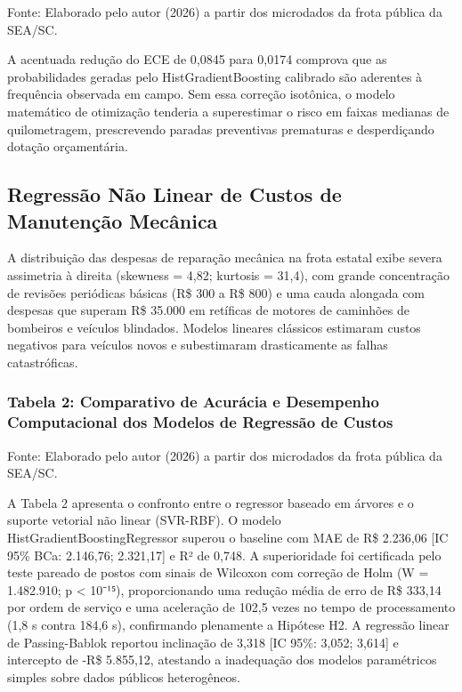 \documentclass[12pt,a4paper]{article}
\begin{document}
Fonte: Elaborado pelo autor (2026) a partir dos microdados da frota pública da SEA/SC.

A acentuada redução do ECE de 0,0845 para 0,0174 comprova que as probabilidades geradas pelo HistGradientBoosting calibrado são aderentes à frequência observada em campo. Sem essa correção isotônica, o modelo matemático de otimização tenderia a superestimar o risco em faixas medianas de quilometragem, prescrevendo paradas preventivas prematuras e desperdiçando dotação orçamentária.


\subsection{Regressão Não Linear de Custos de Manutenção Mecânica}

A distribuição das despesas de reparação mecânica na frota estatal exibe severa assimetria à direita (skewness = 4,82; kurtosis = 31,4), com grande concentração de revisões periódicas básicas (R\$ 300 a R\$ 800) e uma cauda alongada com despesas que superam R\$ 35.000 em retíficas de motores de caminhões de bombeiros e veículos blindados. Modelos lineares clássicos estimaram custos negativos para veículos novos e subestimaram drasticamente as falhas catastróficas.


\subsubsection{Tabela 2: Comparativo de Acurácia e Desempenho Computacional dos Modelos de Regressão de Custos}

\begin{table}[htbp]
\centering
\small
{}
\end{table}

Fonte: Elaborado pelo autor (2026) a partir dos microdados da frota pública da SEA/SC.

A Tabela 2 apresenta o confronto entre o regressor baseado em árvores e o suporte vetorial não linear (SVR-RBF). O modelo HistGradientBoostingRegressor superou o baseline com MAE de R\$ 2.236,06 [IC 95\% BCa: 2.146,76; 2.321,17] e R² de 0,748. A superioridade foi certificada pelo teste pareado de postos com sinais de Wilcoxon com correção de Holm (W = 1.482.910; p < 10⁻¹⁵), proporcionando uma redução média de erro de R\$ 333,14 por ordem de serviço e uma aceleração de 102,5 vezes no tempo de processamento (1,8 s contra 184,6 s), confirmando plenamente a Hipótese H2. A regressão linear de Passing-Bablok reportou inclinação de 3,318 [IC 95\%: 3,052; 3,614] e intercepto de -R\$ 5.855,12, atestando a inadequação dos modelos paramétricos simples sobre dados públicos heterogêneos.
\end{document}
